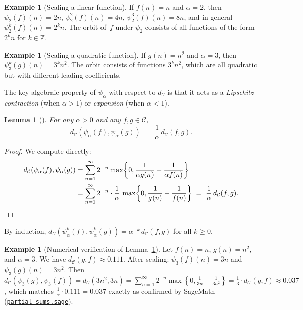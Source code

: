 \documentclass[11pt,a4paper]{article}
\newcommand{\repourl}{https://github.com/guydev42/expansive-homeomorphisms-complexity-qmetric}
\theoremstyle{plain}
\newtheorem{lemmainner}[theoreminner]{Lemma}
\theoremstyle{definition}
\newtheorem{exampleinner}[theoreminner]{Example}
\newenvironment{lemma}[1][]{\begin{lemmainner}[#1]}{\end{lemmainner}}
\newenvironment{example}[1][]{\begin{exampleinner}[#1]}{\end{exampleinner}}
\newcommand{\Z}{\mathbb{Z}}
\newcommand{\C}{\mathcal{C}}
\begin{document}
\begin{example}[Scaling a linear function]
If $f(n)=n$ and $\alpha=2$, then $\psi_2(f)(n)=2n$,
$\psi_2^2(f)(n)=4n$, $\psi_2^3(f)(n)=8n$, and in general
$\psi_2^k(f)(n)=2^k n$.  The orbit of~$f$ under $\psi_2$
consists of all functions of the form $2^k n$ for $k\in\Z$.
\end{example}

\begin{example}[Scaling a quadratic function]
If $g(n)=n^2$ and $\alpha=3$, then $\psi_3^k(g)(n)=3^k n^2$.
The orbit consists of functions $3^k n^2$, which are all
quadratic but with different leading coefficients.
\end{example}

The key algebraic property of $\psi_\alpha$ with respect to $d_\C$
is that it acts as a \emph{Lipschitz contraction} (when $\alpha>1$)
or \emph{expansion} (when $\alpha<1$).

\begin{lemma}\label{lem:scaling-lip}
For any $\alpha>0$ and any $f,g\in\C$,
\[
  d_\C(\psi_\alpha(f),\psi_\alpha(g))
  \;=\; \frac{1}{\alpha}\,d_\C(f,g).
\]
\end{lemma}

\begin{proof}
We compute directly:
\begin{align*}
  d_\C(\psi_\alpha(f),\psi_\alpha(g))
  &= \sum_{n=1}^{\infty}2^{-n}\max\!\left\{0,
     \frac{1}{\alpha g(n)}-\frac{1}{\alpha f(n)}\right\}\\
  &= \sum_{n=1}^{\infty}2^{-n}\cdot\frac{1}{\alpha}\,
     \max\!\left\{0,\frac{1}{g(n)}-\frac{1}{f(n)}\right\}
  \;=\;\frac{1}{\alpha}\,d_\C(f,g). \qedhere
\end{align*}
\end{proof}

By induction, $d_\C(\psi_\alpha^k(f),\psi_\alpha^k(g))
=\alpha^{-k}\,d_\C(f,g)$ for all $k\ge 0$.

\begin{example}[Numerical verification of Lemma~\ref{lem:scaling-lip}]
\label{ex:lip-numerical}
Let $f(n)=n$, $g(n)=n^2$, and $\alpha=3$.  We have
$d_\C(g,f)\approx 0.111$.  After scaling:
$\psi_3(f)(n)=3n$ and $\psi_3(g)(n)=3n^2$.  Then
$d_\C(\psi_3(g),\psi_3(f))=d_\C(3n^2,3n)
=\sum_{n=1}^\infty 2^{-n}\max\!\left\{0,\frac{1}{3n}-\frac{1}{3n^2}\right\}
=\frac{1}{3}\cdot d_\C(g,f)\approx 0.037$, which matches
$\frac{1}{\alpha}\cdot 0.111=0.037$ exactly
as confirmed by SageMath
(\href{\repourl/blob/main/code/sagemath/partial_sums.sage}{\texttt{partial\_sums.sage}}).
\end{example}
\end{document}
